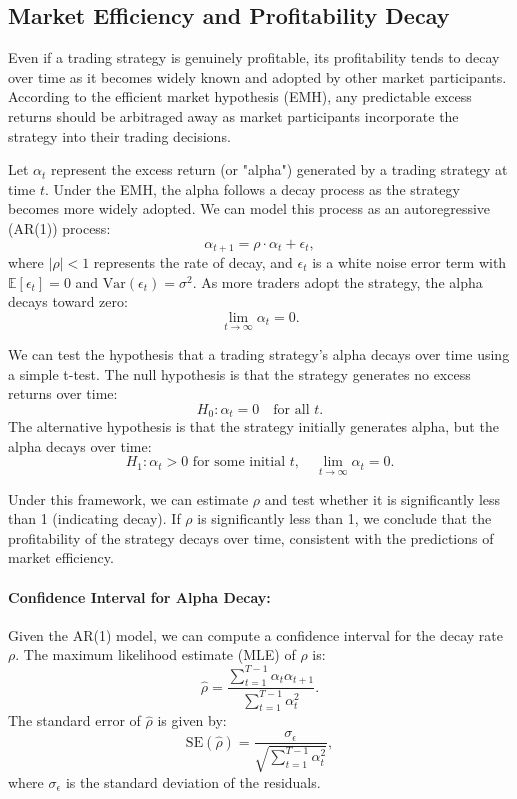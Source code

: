\subsection{Market Efficiency and Profitability Decay}

Even if a trading strategy is genuinely profitable, its profitability tends to decay over time as it becomes widely known and adopted by other market participants. According to the efficient market hypothesis (EMH), any predictable excess returns should be arbitraged away as market participants incorporate the strategy into their trading decisions.

Let $\alpha_t$ represent the excess return (or "alpha") generated by a trading strategy at time $t$. Under the EMH, the alpha follows a decay process as the strategy becomes more widely adopted. We can model this process as an autoregressive (AR(1)) process:
\[
\alpha_{t+1} = \rho \cdot \alpha_t + \epsilon_t,
\]
where $|\rho| < 1$ represents the rate of decay, and $\epsilon_t$ is a white noise error term with $\mathbb{E}[\epsilon_t] = 0$ and $\text{Var}(\epsilon_t) = \sigma^2$. As more traders adopt the strategy, the alpha decays toward zero:
\[
\lim_{t \to \infty} \alpha_t = 0.
\]

We can test the hypothesis that a trading strategy's alpha decays over time using a simple t-test. The null hypothesis is that the strategy generates no excess returns over time:
\[
H_0: \alpha_t = 0 \quad \text{for all } t.
\]
The alternative hypothesis is that the strategy initially generates alpha, but the alpha decays over time:
\[
H_1: \alpha_t > 0 \text{ for some initial } t, \quad \lim_{t \to \infty} \alpha_t = 0.
\]

Under this framework, we can estimate $\rho$ and test whether it is significantly less than 1 (indicating decay). If $\rho$ is significantly less than 1, we conclude that the profitability of the strategy decays over time, consistent with the predictions of market efficiency.

\paragraph{Confidence Interval for Alpha Decay:}

Given the AR(1) model, we can compute a confidence interval for the decay rate $\rho$. The maximum likelihood estimate (MLE) of $\rho$ is:
\[
\hat{\rho} = \frac{\sum_{t=1}^{T-1} \alpha_t \alpha_{t+1}}{\sum_{t=1}^{T-1} \alpha_t^2}.
\]
The standard error of $\hat{\rho}$ is given by:
\[
\text{SE}(\hat{\rho}) = \frac{\sigma_{\epsilon}}{\sqrt{\sum_{t=1}^{T-1} \alpha_t^2}},
\]
where $\sigma_{\epsilon}$ is the standard deviation of the residuals.

